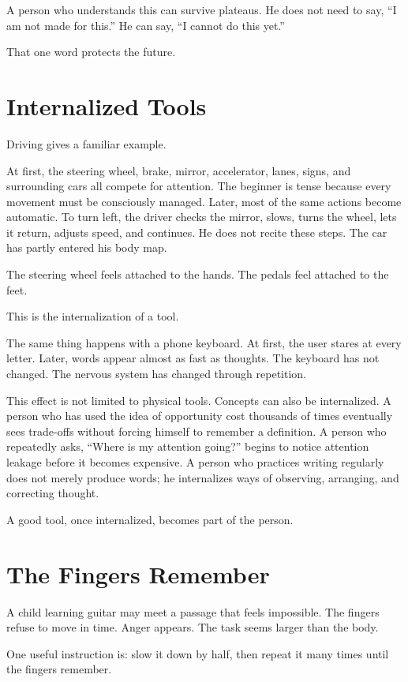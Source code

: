 A person who understands this can survive plateaus. He does not need to say, ``I am not made for this.'' He can say, ``I cannot do this yet.''

That one word protects the future.

\section*{Internalized Tools}

Driving gives a familiar example.

At first, the steering wheel, brake, mirror, accelerator, lanes, signs, and surrounding cars all compete for attention. The beginner is tense because every movement must be consciously managed. Later, most of the same actions become automatic. To turn left, the driver checks the mirror, slows, turns the wheel, lets it return, adjusts speed, and continues. He does not recite these steps. The car has partly entered his body map.

The steering wheel feels attached to the hands. The pedals feel attached to the feet.

This is the internalization of a tool.

The same thing happens with a phone keyboard. At first, the user stares at every letter. Later, words appear almost as fast as thoughts. The keyboard has not changed. The nervous system has changed through repetition.

This effect is not limited to physical tools. Concepts can also be internalized. A person who has used the idea of opportunity cost thousands of times eventually sees trade-offs without forcing himself to remember a definition. A person who repeatedly asks, ``Where is my attention going?'' begins to notice attention leakage before it becomes expensive. A person who practices writing regularly does not merely produce words; he internalizes ways of observing, arranging, and correcting thought.

A good tool, once internalized, becomes part of the person.

\section*{The Fingers Remember}

A child learning guitar may meet a passage that feels impossible. The fingers refuse to move in time. Anger appears. The task seems larger than the body.

One useful instruction is: slow it down by half, then repeat it many times until the fingers remember.

